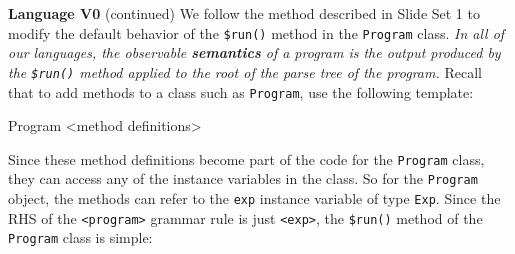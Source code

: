 \begin{minipage}[t]{\sw}
\slidenumber
\LARGE
{\bf Language V0} (continued)\exx
We follow the method described in Slide Set 1
to modify the default behavior of the \verb'$run()' method
in the \verb'Program' class.
{\em In all of our languages,
the observable {\bf semantics} of a program
is the output produced by the \verb'$run()' method
applied to the root of the parse tree of the program.}\exx
Recall that to add methods to a class such as \verb'Program',
use the following template:
\Large
\begin{qv}
Program
<method definitions>
\end{qv}
\LARGE
Since these method definitions become part
of the code for the \verb'Program' class,
they can access any of the instance variables in the class.
So for the \verb'Program' object,
the methods can refer to the \verb'exp' instance variable
of type \verb'Exp'.
Since the RHS of the \verb'<program>' grammar rule is just \verb'<exp>',
the \verb'$run()' method of the \verb'Program' class is simple:
{\Large
{}
}
\end{minipage}
\clearpage
